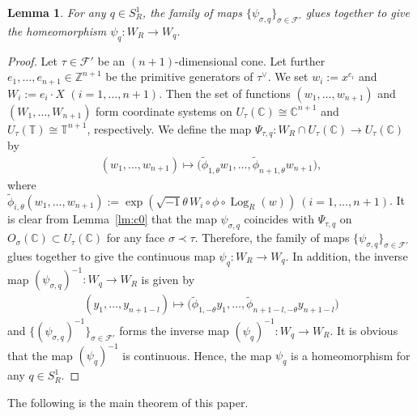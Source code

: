 \documentclass[10pt,a4paper]{amsart}
\numberwithin{equation}{section}
\newtheorem{Lemma}[Theorem]{Lemma}
\begin{document}
\begin{Lemma}\label{lm:c1}
For any $q \in S_R^1$, the family of maps $\{\psi_{\sigma,q}\}_{\sigma \in {\mathcal F}'}$ glues together to give the homeomorphism $\psi_{q} \colon W_R \to W_q$.
\end{Lemma}
\begin{proof}
Let $\tau \in {\mathcal F}'$ be an $(n+1)$-dimensional cone. Let further $e_1, \dots, e_{n+1} \in {\mathbb Z}^{n+1}$ be the primitive generators of $\tau^\vee$. We set $w_i:=x^{e_i}$ and $W_i:=e_i \cdot X$ $(i=1,\dots, n+1)$. Then the set of functions $(w_1, \dots, w_{n+1})$ and $(W_1, \dots, W_{n+1})$ form coordinate systems on $U_\tau({\mathbb C}) \cong {\mathbb C}^{n+1}$ and $U_\tau({\mathbb T}) \cong {\mathbb T}^{n+1}$, respectively. We def\/ine the map $\Psi_{\tau,q} \colon W_R \cap U_\tau({\mathbb C}) \to U_\tau({\mathbb C})$ by
\begin{gather*}
(w_1, \dots ,w_{n+1}) \mapsto \big(\tilde{\phi}_{1,\theta}w_1, \dots, \tilde{\phi}_{n+1,\theta}w_{n+1}\big),
\end{gather*}
where $\tilde{\phi}_{i,\theta}(w_1, \dots, w_{n+1}) := \exp \left(\sqrt{-1} \theta \, W_i \circ \phi \circ \operatorname{Log}_R (w) \right)\ (i=1, \dots, n+1)$. It is clear from Lemma~\ref{lm:c0} that the map $\psi_{\sigma,q}$ coincides with $\Psi_{\tau,q}$ on $O_\sigma({\mathbb C}) \subset U_\tau({\mathbb C})$ for any face \mbox{$\sigma \prec \tau$}. Therefore, the family of maps $\{\psi_{\sigma,q}\}_{\sigma \in {\mathcal F}'}$ glues together to give the continuous map \mbox{$\psi_{q} \colon W_R \to W_q$}. In addition, the inverse map $(\psi_{\sigma,q})^{-1} \colon W_q \to W_R$ is given by
\begin{gather*}
(y_1, \dots ,y_{n+1-l}) \mapsto \big(\tilde{\phi}_{1,-\theta}y_1, \dots, \tilde{\phi}_{n+1-l,-\theta}y_{n+1-l}\big)
\end{gather*}
and $\{ (\psi_{\sigma,q})^{-1}\}_{\sigma \in {\mathcal F}'}$ forms the inverse map $(\psi_q)^{-1} \colon W_q \to W_R$. It is obvious that the map $(\psi_q)^{-1}$ is continuous. Hence, the map $\psi_q$ is a homeomorphism for any $q \in S_R^1$.
\end{proof}

The following is the main theorem of this paper.
\end{document}
